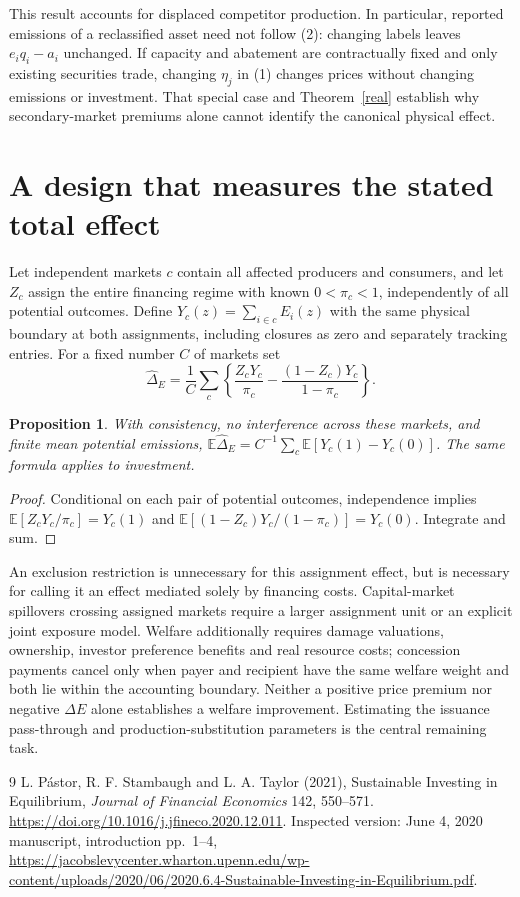 \documentclass[11pt]{article}
\newtheorem{proposition}[theorem]{Proposition}
\newcommand{\E}{\mathbb E}
\begin{document}
This result accounts for displaced competitor production. In particular,
reported emissions of a reclassified asset need not follow (2): changing
labels leaves $e_iq_i-a_i$ unchanged. If capacity and abatement are
contractually fixed and only existing securities trade, changing $\eta_j$
in (1) changes prices without changing emissions or investment. That
special case and Theorem~\ref{real} establish why secondary-market
premiums alone cannot identify the canonical physical effect.

\section{A design that measures the stated total effect}
Let independent markets $c$ contain all affected producers and consumers,
and let $Z_c$ assign the entire financing regime with known
$0<\pi_c<1$, independently of all potential outcomes. Define
$Y_c(z)=\sum_{i\in c}E_i(z)$ with the same physical boundary at both
assignments, including closures as zero and separately tracking entries.
For a fixed number $C$ of markets set
\[
 \widehat\Delta_E=\frac1C\sum_c
 \left\{\frac{Z_cY_c}{\pi_c}-
             \frac{(1-Z_c)Y_c}{1-\pi_c}\right\}.
\]
\begin{proposition}
With consistency, no interference across these markets, and finite mean
potential emissions, $\E\widehat\Delta_E=C^{-1}\sum_c
\E[Y_c(1)-Y_c(0)]$. The same formula applies to investment.
\end{proposition}
\begin{proof}
Conditional on each pair of potential outcomes, independence implies
$\E[Z_cY_c/\pi_c]=Y_c(1)$ and
$\E[(1-Z_c)Y_c/(1-\pi_c)]=Y_c(0)$. Integrate and sum.
\end{proof}

An exclusion restriction is unnecessary for this assignment effect, but
is necessary for calling it an effect mediated solely by financing costs.
Capital-market spillovers crossing assigned markets require a larger
assignment unit or an explicit joint exposure model. Welfare additionally
requires damage valuations, ownership, investor preference benefits and
real resource costs; concession payments cancel only when payer and
recipient have the same welfare weight and both lie within the accounting
boundary. Neither a positive price premium nor negative $\Delta E$ alone
establishes a welfare improvement. Estimating the issuance pass-through
and production-substitution parameters is the central remaining task.

\begin{thebibliography}{9}
 L. P\'astor, R. F. Stambaugh and L. A. Taylor (2021),
Sustainable Investing in Equilibrium, \emph{Journal of Financial Economics}
142, 550--571. \url{https://doi.org/10.1016/j.jfineco.2020.12.011}.
Inspected version: June 4, 2020 manuscript, introduction pp.\ 1--4,
\url{https://jacobslevycenter.wharton.upenn.edu/wp-content/uploads/2020/06/2020.6.4-Sustainable-Investing-in-Equilibrium.pdf}.
\end{thebibliography}
\end{document}
